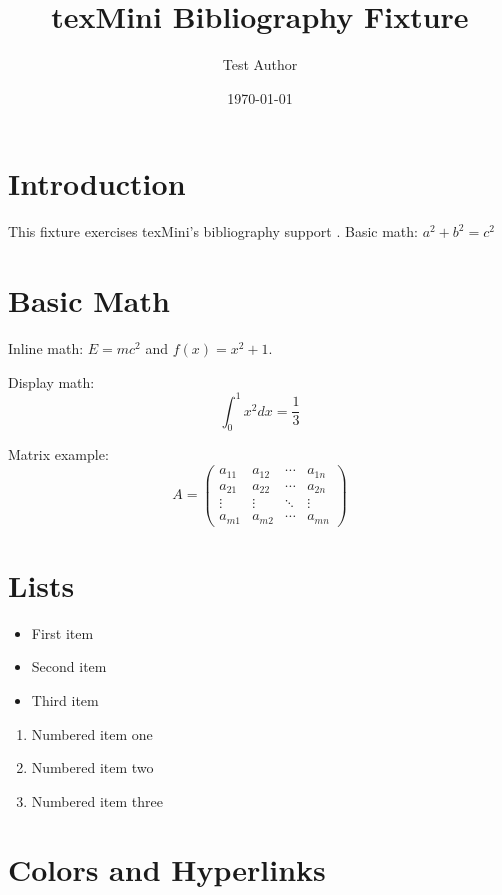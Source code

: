 \documentclass[11pt]{article}
\title{texMini Bibliography Fixture}
\author{Test Author}
\date{\today}
\begin{document}
\maketitle

\section{Introduction}

This fixture exercises texMini's bibliography support \cite{testwork2024}. Basic math: $a^2 + b^2 = c^2$

\section{Basic Math}

Inline math: $E = mc^2$ and $f(x) = x^2 + 1$.

Display math:
\begin{equation}
    \int_0^1 x^2 dx = \frac{1}{3}
\end{equation}

Matrix example:
\begin{equation}
    A = \begin{pmatrix}
        a_{11} & a_{12} & \cdots & a_{1n} \\
        a_{21} & a_{22} & \cdots & a_{2n} \\
        \vdots & \vdots & \ddots & \vdots \\
        a_{m1} & a_{m2} & \cdots & a_{mn}
    \end{pmatrix}
\end{equation}

\section{Lists}

\begin{itemize}
    \item First item
    \item Second item
    \item Third item
\end{itemize}

\begin{enumerate}
    \item Numbered item one
    \item Numbered item two
    \item Numbered item three
\end{enumerate}

\section{Colors and Hyperlinks}
\end{document}
